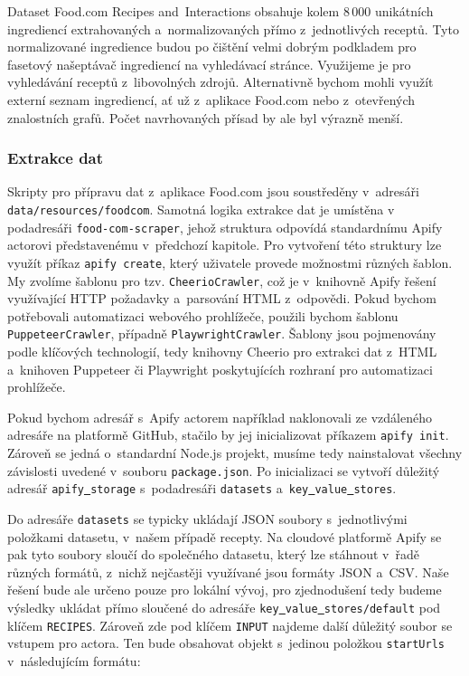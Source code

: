 Dataset Food.com Recipes and~Interactions obsahuje kolem $8\,000$ unikátních ingrediencí extrahovaných a~normalizovaných přímo z~jednotlivých receptů. Tyto normalizované ingredience budou po čištění velmi dobrým podkladem pro fasetový našeptávač ingrediencí na vyhledávací stránce. Využijeme je pro vyhledávání receptů z~libovolných zdrojů. Alternativně bychom mohli využít externí seznam ingrediencí, ať už z~aplikace Food.com nebo z~otevřených znalostních grafů. Počet navrhovaných přísad by ale byl výrazně menší.

\subsubsection{Extrakce dat}

Skripty pro přípravu dat z~aplikace Food.com jsou soustředěny v~adresáři \texttt{data/resources/foodcom}. Samotná logika extrakce dat je umístěna v podadresáři \texttt{food-com-scraper}, jehož struktura odpovídá standardnímu Apify actorovi představenému v~předchozí kapitole. Pro vytvoření této struktury lze využít příkaz \texttt{apify\,create}, který uživatele provede možnostmi různých šablon. My zvolíme šablonu pro tzv. \texttt{CheerioCrawler}, což je v~knihovně Apify řešení využívající HTTP požadavky a~parsování HTML z~odpovědi. Pokud bychom potřebovali automatizaci webového prohlížeče, použili bychom šablonu \texttt{PuppeteerCrawler}, případně \texttt{PlaywrightCrawler}. Šablony jsou pojmenovány podle klíčových technologií, tedy knihovny Cheerio pro extrakci dat z~HTML a~knihoven Puppeteer či Playwright poskytujících rozhraní pro automatizaci prohlížeče.

Pokud bychom adresář s~Apify actorem například naklonovali ze vzdáleného adresáře na platformě GitHub, stačilo by jej inicializovat příkazem \texttt{apify\,init}. Zároveň se jedná o~standardní Node.js projekt, musíme tedy nainstalovat všechny závislosti uvedené v~souboru \texttt{package.json}. Po inicializaci se vytvoří důležitý adresář \texttt{apify\underline{{ }}storage} s~podadresáři \texttt{datasets} a~\texttt{key\underline{{ }}value\underline{{ }}stores}.

Do adresáře \texttt{datasets} se typicky ukládají JSON soubory s~jednotlivými položkami datasetu, v~našem případě recepty. Na cloudové platformě Apify se pak tyto soubory sloučí do společného datasetu, který lze stáhnout v~řadě různých formátů, z~nichž nejčastěji využívané jsou formáty JSON a~CSV. Naše řešení bude ale určeno pouze pro lokální vývoj, pro zjednodušení tedy budeme výsledky ukládat přímo sloučené do adresáře \texttt{key\underline{{ }}value\underline{{ }}stores/default} pod klíčem \texttt{RECIPES}. Zároveň zde pod klíčem \texttt{INPUT} najdeme další důležitý soubor se vstupem pro actora. Ten bude obsahovat objekt s~jedinou položkou \texttt{startUrls} v~následujícím formátu:

